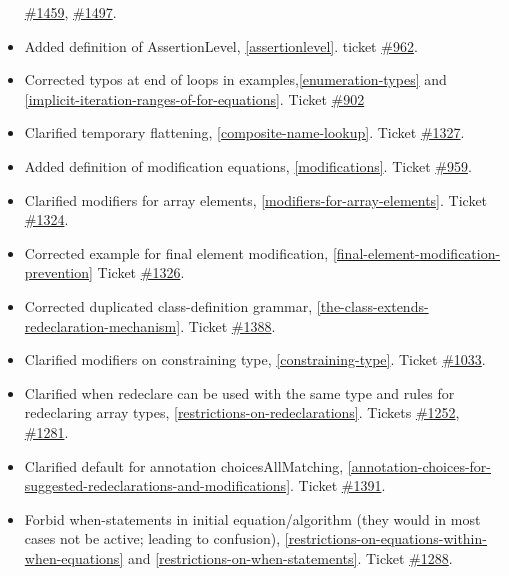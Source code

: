 \documentclass[10pt,a4paper]{report}
\begin{document}
\begin{itemize}
  \href{https://trac.modelica.org/Modelica/ticket/1459}{\#1459},
  \href{https://trac.modelica.org/Modelica/ticket/1497}{\#1497}.
\item
  Added definition of AssertionLevel, \ref{assertionlevel}. ticket
  \href{https://trac.modelica.org/Modelica/ticket/962}{\#962}.
\item
  Corrected typos at end of loops in examples,\ref{enumeration-types} and
  \ref{implicit-iteration-ranges-of-for-equations}. Ticket
  \href{https://trac.modelica.org/Modelica/ticket/902}{\#902}
\item
  Clarified temporary flattening, \ref{composite-name-lookup}. Ticket
  \href{https://trac.modelica.org/Modelica/ticket/1327}{\#1327}.
\item
  Added definition of modification equations, \ref{modifications}. Ticket
  \href{https://trac.modelica.org/Modelica/ticket/959}{\#959}.
\item
  Clarified modifiers for array elements, \ref{modifiers-for-array-elements}. Ticket
  \href{https://trac.modelica.org/Modelica/ticket/1324}{\#1324}.
\item
  Corrected example for final element modification, \ref{final-element-modification-prevention}
  Ticket \href{https://trac.modelica.org/Modelica/ticket/1326}{\#1326}.
\item
  Corrected duplicated class-definition grammar, \ref{the-class-extends-redeclaration-mechanism}. Ticket
  \href{https://trac.modelica.org/Modelica/ticket/1388}{\#1388}.
\item
  Clarified modifiers on constraining type, \ref{constraining-type}. Ticket
  \href{https://trac.modelica.org/Modelica/ticket/1033}{\#1033}.
\item
  Clarified when redeclare can be used with the same type and rules for
  redeclaring array types, \ref{restrictions-on-redeclarations}. Tickets
  \href{https://trac.modelica.org/Modelica/ticket/1252}{\#1252},
  \href{https://trac.modelica.org/Modelica/ticket/1281}{\#1281}.
\item
  Clarified default for annotation choicesAllMatching, \ref{annotation-choices-for-suggested-redeclarations-and-modifications}.
  Ticket \href{https://trac.modelica.org/Modelica/ticket/1391}{\#1391}.
\item
  Forbid when-statements in initial equation/algorithm (they would in
  most cases not be active; leading to confusion), \ref{restrictions-on-equations-within-when-equations} and
  \ref{restrictions-on-when-statements}. Ticket
  \href{https://trac.modelica.org/Modelica/ticket/1288}{\#1288}.

\end{itemize}
\end{document}
